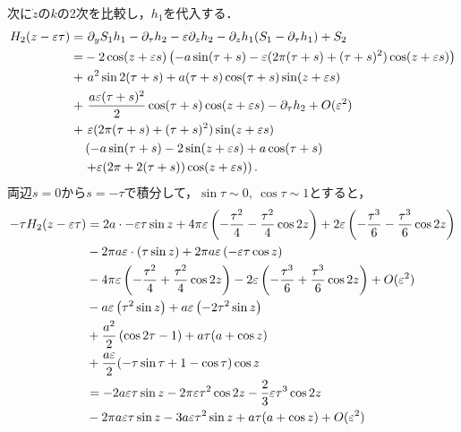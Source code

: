 \documentclass[../main]{subfiles}
\begin{document}
    次に$\dot{z}$の$k$の2次を比較し，$h_1$を代入する．
    \begin{align}
        \begin{split}
            H_2(z-\varepsilon \tau)=&\ \partial_y S_1h_1 -\partial_\tau h_2-\varepsilon\partial_zh_2 -\partial_zh_1(S_1-\partial_\tau h_1)+S_2\\
            =&-2\cos (z+\varepsilon s)\left( -a\sin(\tau+s)-\varepsilon(2\pi (\tau+s)+(\tau+s)^2) \cos (z+\varepsilon s) \right)\\
            +&\ a^2\sin 2(\tau+s)+a(\tau+s)\cos (\tau+s)\sin (z+\varepsilon s)\\
            +&\ \frac{a\varepsilon (\tau+s)^2}{2}\cos (\tau+s) \cos (z+\varepsilon s)-\partial_\tau h_2+O(\varepsilon^2)\\
            +&\ \varepsilon(2\pi(\tau+s)+(\tau+s)^2)\sin (z+\varepsilon s) \\
            &\left( -a\sin(\tau+s)-2\sin (z+\varepsilon s) +a\cos(\tau+s)\right.\\
            &\left.+\varepsilon(2\pi +2(\tau+s))\cos (z+\varepsilon s)\right).
        \end{split}
    \end{align}
    両辺$s=0$から$s=-\tau$で積分して，$\sin\tau\sim 0,\ \cos\tau\sim 1$とすると，
    \begin{align}
        -\tau H_2(z-\varepsilon \tau)&=2a\cdot -\varepsilon \tau\sin z+4\pi\varepsilon\left( -\frac{\tau^2}{4} -\frac{\tau^2}{4}\cos 2z\right)+2\varepsilon\left( -\frac{\tau^3}{6} -\frac{\tau^3}{6}\cos 2 z\right)\notag\\
        &-2\pi a\varepsilon\cdot\left(\tau\sin z\right)+2\pi a\varepsilon\left(-\varepsilon \tau\cos z\right)\notag\\
        &-4\pi\varepsilon\left(-\frac{\tau^2}{4}+\frac{\tau^2}{4}\cos 2 z\right)-2\varepsilon\left( -\frac{\tau^3}{6} +\frac{\tau^3}{6}\cos 2z\right)+O(\varepsilon^2)\notag\\
        &-a\varepsilon\left( \tau^2\sin z \right)+a\varepsilon\left( -2\tau^2\sin z \right)\notag\\
        &+\frac{a^2}{2}\left( \cos 2\tau-1\right)+a\tau(a+\cos z)\notag\\
        &+\frac{a\varepsilon}{2}(-\tau\sin\tau+1-\cos\tau)\cos z\notag\\
        &=-2a\varepsilon \tau\sin z-2\pi\varepsilon\tau^2\cos 2 z-\frac{2}{3}\varepsilon\tau^3\cos 2z\notag\\
        &-2\pi a\varepsilon \tau\sin z-3a\varepsilon\tau^2\sin z+a\tau(a+\cos z)+O(\varepsilon^2)
    \end{align}
\end{document}
